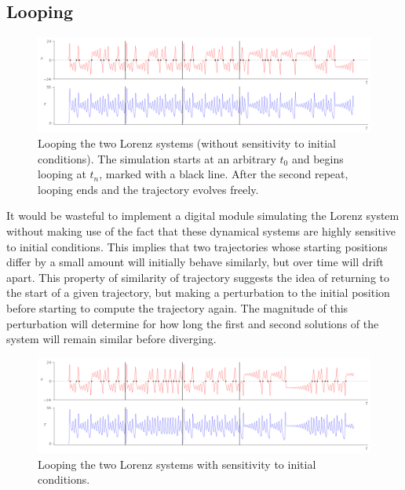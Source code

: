 \documentclass{tufte-handout}
\begin{document}
\subsection{Looping}\label{sec:looping}


\begin{figure}[h]
  \includegraphics[width=\linewidth]{looping_voltages.png}%
  \caption{Looping the two Lorenz systems (without sensitivity to initial conditions). The simulation starts at an arbitrary $t_0$ and begins looping at $t_n$, marked with a black line. After the second repeat, looping ends and the trajectory evolves freely.}%
  \label{fig:looping_voltages}%
\end{figure}

It would be wasteful to implement a digital module simulating the Lorenz system without making use of the fact that these dynamical systems are highly sensitive to initial conditions. This implies that two trajectories whose starting positions differ by a small amount will initially behave similarly, but over time will drift apart.
This property of similarity of trajectory suggests the idea of returning to the start of a given trajectory, but making a perturbation to the initial position before starting to compute the trajectory again. The magnitude of this perturbation will determine for how long the first and second solutions of the system will remain similar before diverging.

\begin{figure}[h]
  \includegraphics[width=\linewidth]{dependent_loop.png}%
  \caption{Looping the two Lorenz systems with sensitivity to initial conditions.}%
  \label{fig:dependent_loop}%
\end{figure}
\end{document}
